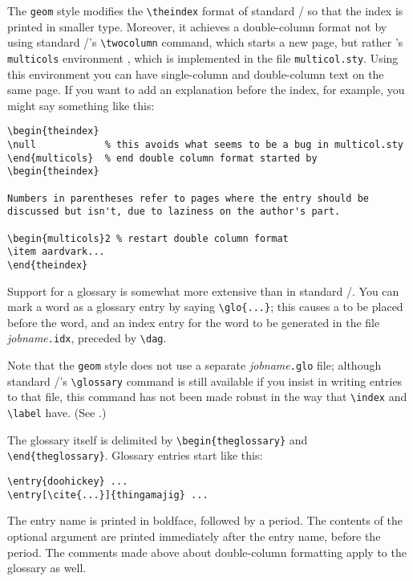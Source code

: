 \begin{wizard}
The \verb+geom+ style modifies the \verb+\theindex+ format of standard
\latex/ so that the index is printed in smaller type.  Moreover, it
achieves a double-column format not by using standard \latex/'s
\verb+\twocolumn+ command, which starts a new page, but rather
's \verb+multicols+ environment \cite{Mittelbach},
which is implemented in the file \verb+multicol.sty+.  Using this
environment you can have single-column and double-column text on the
same page.  If you want to add an explanation before the index, for
example, you might say something like this:
\begin{verbatim}
\begin{theindex}
\null            % this avoids what seems to be a bug in multicol.sty
\end{multicols}  % end double column format started by \begin{theindex}

Numbers in parentheses refer to pages where the entry should be
discussed but isn't, due to laziness on the author's part.

\begin{multicols}2 % restart double column format
\item aardvark...
\end{theindex}
\end{verbatim}
\end{wizard}

Support for a glossary is somewhat more extensive than in standard
\latex/. You can mark a word as a glossary entry by saying
\verb+\glo{...}+; this causes a  to be placed before the
word, and an index entry for the word to be generated in the file {\it
jobname}\verb+.idx+, preceded by \verb+\dag+.  

\begin{wizard}
Note that the
\verb+geom+ style does not use a separate {\it jobname}\verb+.glo+
file; although standard \latex/'s \verb+\glossary+ command is still
available if you insist in writing entries to that file, this command
has not been made robust in the way that \verb+\index+ and \verb+\label+
have. (See .)
\end{wizard}

The glossary itself is
delimited by \verb+\begin{theglossary}+ and \verb+\end{theglossary}+.
Glossary entries start like this:
%
\begin{verbatim}
\entry{doohickey} ...
\entry[\cite{...}]{thingamajig} ...
\end{verbatim}
%
The entry name is printed in boldface, followed by a period.
The contents of the optional argument are printed immediately after
the entry name, before the period.  The comments made above about
double-column formatting apply to the glossary as well.

